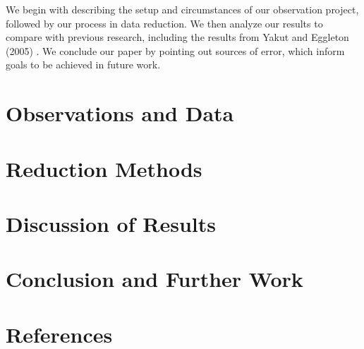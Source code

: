 \documentclass{article}
\begin{document}
    We begin with describing the setup and circumstances of our observation project, followed by our process in data reduction. We then analyze our results to compare with previous research, including the results from Yakut and Eggleton (2005) \cite{2005ApJ...629.1055Y}. We conclude our paper by pointing out sources of error, which inform goals to be achieved in future work.

\section{Observations and Data}
\section{Reduction Methods}
\section{Discussion of Results}
\section{Conclusion and Further Work}
\section{References}
 

\end{document}

